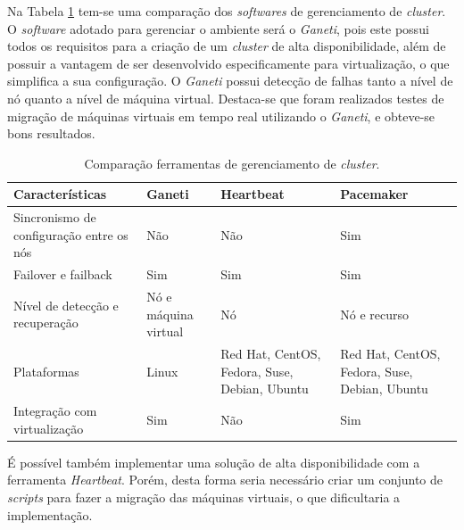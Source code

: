 Na Tabela \ref{tab:clusterger} tem-se uma comparação dos \textit{softwares} de gerenciamento de \textit{cluster}. 
O \textit{software} adotado para gerenciar o ambiente será o \textit{Ganeti}, pois este possui todos os requisitos para a criação de um 
\textit{cluster} de alta disponibilidade, além de possuir a vantagem de ser desenvolvido especificamente para virtualização, o que simplifica a 
sua configuração. O \textit{Ganeti} possui detecção de falhas tanto a nível de nó quanto a nível de máquina virtual. 
Destaca-se que foram realizados testes de migração de máquinas virtuais em tempo real utilizando o \textit{Ganeti}, e obteve-se bons resultados.


\begin{table}[h!]
\caption{Comparação ferramentas de gerenciamento de \textit{cluster}.}
\label{tab:clusterger}
\begin{center}
\begin{tabular}{|p{4cm}|p{2cm}|p{3.5cm}|p{3.5cm}|}\hline
\textbf{Características} & \textbf{Ganeti} & \textbf{Heartbeat} & \textbf{Pacemaker} \\\hline
Sincronismo de configuração entre os nós & Não & Não & Sim \\\hline
Failover e failback & Sim & Sim & Sim \\\hline
Nível de detecção e recuperação & Nó e máquina virtual & Nó & Nó e recurso \\\hline
Plataformas & Linux & Red Hat, CentOS, Fedora, Suse, Debian, Ubuntu & Red Hat, CentOS, Fedora, Suse, Debian, Ubuntu \\\hline
Integração com virtualização & Sim & Não & Sim \\\hline
\end{tabular}
\end{center}
\end{table}

É possível também implementar uma solução de alta disponibilidade com a ferramenta \textit{Heartbeat}. Porém, desta forma seria necessário criar 
um conjunto de \textit{scripts} para fazer a migração das máquinas virtuais, o que dificultaria a implementação.

